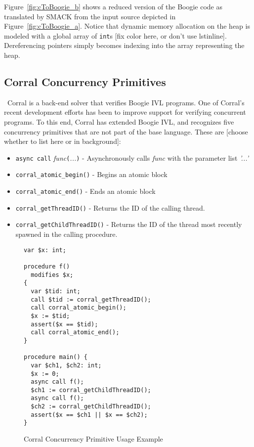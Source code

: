Figure~\ref{fig:cToBoogie_b} shows a reduced version of the Boogie code as translated by SMACK from the input source depicted in Figure~\ref{fig:cToBoogie_a}.  Notice that dynamic memory allocation on the heap is modeled with a global array of \lstinline|int|s [fix color here, or don't use lstinline].  Dereferencing pointers simply becomes indexing into the array representing the heap.

\subsection{Corral Concurrency Primitives}\
Corral is a back-end solver that verifies Boogie IVL programs.  One of Corral's recent development efforts has been to improve support for verifying concurrent programs.  To this end, Corral has extended Boogie IVL, and recognizes five concurrency primitives that are not part of the base language.  These are [choose whether to list here or in background]:


\begin{itemize}
\item \lstinline|async call| \emph{func}\lstinline|(|\emph{...}\lstinline|)| - Asynchronously calls \emph{func} with the parameter list \emph{'...'}
\item \lstinline|corral_atomic_begin()| - Begins an atomic block
\item \lstinline|corral_atomic_end()| - Ends an atomic block
\item \lstinline|corral_getThreadID()| - Returns the ID of the calling thread.
\item \lstinline|corral_getChildThreadID()| - Returns the ID of the thread most recently spawned in the calling procedure.
\end{itemize}

\begin{figure}[h]
\centering
\begin{lstlisting}[language=boogie]
var $x: int;

procedure f() 
  modifies $x;
{
  var $tid: int;
  call $tid := corral_getThreadID();
  call corral_atomic_begin();
  $x := $tid;
  assert($x == $tid);
  call corral_atomic_end();
}

procedure main() {
  var $ch1, $ch2: int;
  $x := 0;
  async call f();
  $ch1 := corral_getChildThreadID();
  async call f();
  $ch2 := corral_getChildThreadID();
  assert($x == $ch1 || $x == $ch2);
}
\end{lstlisting}
\caption{Corral Concurrency Primitive Usage Example}
\label{fig:corralprimitives}
\end{figure}

